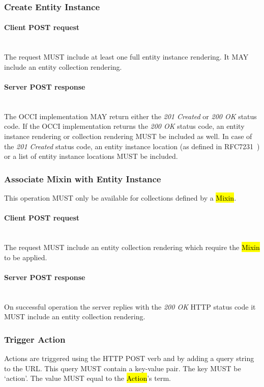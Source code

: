 \documentclass[10pt,a4paper]{article}
\begin{document}
\subsubsection{Create Entity Instance}

\paragraph*{Client POST request}\hfill\\
The request MUST include at least one full entity instance rendering.
It MAY include an entity collection rendering.

\paragraph*{Server POST response}\hfill\\
The OCCI implementation MAY return either the \emph{201 Created} or \emph{200 OK} status code. If the OCCI implementation
returns the \emph{200 OK} status code, an entity instance rendering or collection rendering MUST be included as well.
In case of the \emph{201 Created} status code, an entity instance location (as defined in RFC7231~\cite{rfc7231})
or a list of entity instance locations MUST be included.

\subsubsection{Associate Mixin with Entity Instance}
This operation MUST only be available for collections defined by a \hl{Mixin}.

\paragraph*{Client POST request}\hfill\\
The request MUST include an entity collection rendering which require the \hl{Mixin} to be applied.

\paragraph*{Server POST response}\hfill\\
On successful operation the server replies with the \emph{200 OK} HTTP status code it MUST include an entity collection rendering.

\subsubsection{Trigger Action}
Actions are triggered using the HTTP POST verb and by adding a query string to the URL.
This query MUST contain a key-value pair. The key MUST be `action'. The value MUST
equal to the \hl{Action}'s term.
\end{document}
